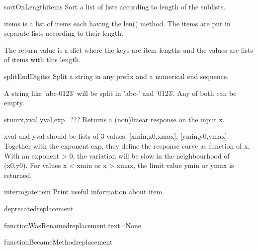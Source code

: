 \begin{funcdesc}{sortOnLength}{items}
Sort a list of lists according to length of the sublists.

    items is a list of items each having the len() method.
    The items are put in separate lists according to their length.

    The return value is a dict where the keys are item lengths and
    the values are lists of items with this length.
    

\end{funcdesc}


\begin{funcdesc}{splitEndDigits}{s}
Split a string in any prefix and a numerical end sequence.

    A string like 'abc-0123' will be split in 'abc-' and '0123'.
    Any of both can be empty.
    

\end{funcdesc}


\begin{funcdesc}{stuur}{x,xval,yval,exp=???}
Returns a (non)linear response on the input x.

    xval and yval should be lists of 3 values:
      [xmin,x0,xmax], [ymin,y0,ymax].
    Together with the exponent exp, they define the response curve
    as function of x. With an exponent > 0, the variation will be
    slow in the neighbourhood of (x0,y0).
    For values x < xmin or x > xmax, the limit value ymin or ymax
    is returned.
    

\end{funcdesc}


\begin{funcdesc}{interrogate}{item}
Print useful information about item.

\end{funcdesc}


\begin{funcdesc}{deprecated}{replacement}


\end{funcdesc}


\begin{funcdesc}{functionWasRenamed}{replacement,text=None}


\end{funcdesc}


\begin{funcdesc}{functionBecameMethod}{replacement}


\end{funcdesc}



